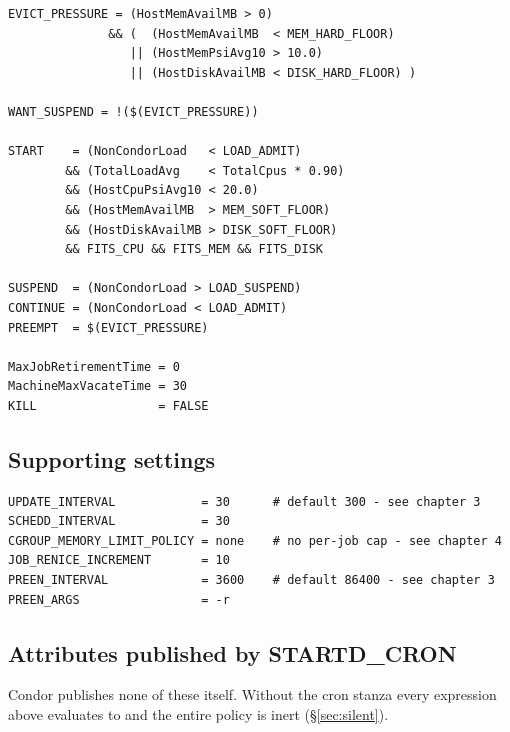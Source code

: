 \begin{lstlisting}
EVICT_PRESSURE = (HostMemAvailMB > 0)
              && (  (HostMemAvailMB  < MEM_HARD_FLOOR)
                 || (HostMemPsiAvg10 > 10.0)
                 || (HostDiskAvailMB < DISK_HARD_FLOOR) )

WANT_SUSPEND = !($(EVICT_PRESSURE))

START    = (NonCondorLoad   < LOAD_ADMIT)
        && (TotalLoadAvg    < TotalCpus * 0.90)
        && (HostCpuPsiAvg10 < 20.0)
        && (HostMemAvailMB  > MEM_SOFT_FLOOR)
        && (HostDiskAvailMB > DISK_SOFT_FLOOR)
        && FITS_CPU && FITS_MEM && FITS_DISK

SUSPEND  = (NonCondorLoad > LOAD_SUSPEND)
CONTINUE = (NonCondorLoad < LOAD_ADMIT)
PREEMPT  = $(EVICT_PRESSURE)

MaxJobRetirementTime = 0
MachineMaxVacateTime = 30
KILL                 = FALSE
\end{lstlisting}

\subsection{Supporting settings}

\begin{lstlisting}
UPDATE_INTERVAL            = 30      # default 300 - see chapter 3
SCHEDD_INTERVAL            = 30
CGROUP_MEMORY_LIMIT_POLICY = none    # no per-job cap - see chapter 4
JOB_RENICE_INCREMENT       = 10
PREEN_INTERVAL             = 3600    # default 86400 - see chapter 3
PREEN_ARGS                 = -r
\end{lstlisting}

\subsection{Attributes published by STARTD\_CRON}

Condor publishes none of these itself. Without the cron stanza every expression
above evaluates to  and the entire policy is inert
(\S\ref{sec:silent}).

